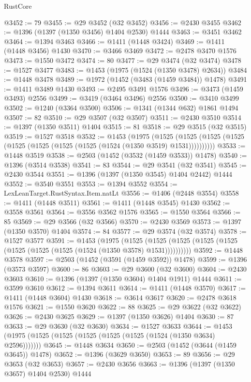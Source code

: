 \begin{lexlean}{RustCore}
\begin{coremodule}
{\begin{coremodule}
{{{{{{{{{{{{{{{{{{{{{{{{{{{{{{{{{{{{{{{{{{{{{@3452 := 79
@3455 := @29 @3452 (@32 @3452)
@3456 := @2430 @3455
@3462 := @1396 (@1397 (@1350 @3456) @1404 @2530) @1444
@3463 := @3451 @3462
@3464 := @1394 @3463
@3466 := @1411 (@1448 @3424)
@3469 := @1411 (@1448 @3456) @1430
@3470 := @3466 @3469
@3472 := @2478 @3470 @1576
@3473 := @1550 @3472
@3474 := 80
@3477 := @29 @3474 (@32 @3474)
@3478 := @1527 @3477
@3483 := @1453 (@1975 (@1524 (@1350 @3478) @2634))
@3484 := @1448 @3478
@3489 := @1972 (@1452 (@3483 (@1459 @3484)) @1478)
@3491 := @1411 @3489 @1430
@3493 := @2495 @3491 @1576
@3496 := @3473 (@1459 @3493) @2556
@3499 := @3419 (@3464 @3496) @2556
@3500 := @3410 @3499
@3502 := @1240 (@3364 @3500)
@3506 := @1341 (@1344 @632) @1861 @1494
@3507 := 82
@3510 := @29 @3507 (@32 @3507)
@3511 := @2430 @3510
@3514 := @1397 (@1350 @3511) @1404
@3515 := 81
@3518 := @29 @3515 (@32 @3515)
@3519 := @1527 @3518
@3532 := @1453
    (@1975
      (@1525 (@1525 (@1525 (@1525 (@1525 (@1525 (@1525 (@1525 (@1524 (@1350 @3519) @1531))))))))))
@3533 := @1448 @3519
@3538 := @2503 (@1452 (@3532 (@1459 @3533)) @1478)
@3540 := @1396 (@3514 @3538)
@3541 := 83
@3544 := @29 @3541 (@32 @3541)
@3545 := @2430 @3544
@3551 := @1396 (@1397 (@1350 @3545) @1404 @2442) @1444
@3552 := @3540 @3551
@3553 := @1394 @3552
@3554 := LexLeanTarget.RustSyntax.Item.natLt
@3556 := @1406 (@2448 @3554)
@3558 := @1411 (@1448 @3511)
@3561 := @1411 (@1448 @3545) @1430
@3562 := @3558 @3561
@3564 := @3556 @3562 @1576
@3565 := @1550 @3564
@3566 := 85
@3569 := @29 @3566 (@32 @3566)
@3570 := @2430 @3569
@3573 := @1397 (@1350 @3570) @1404
@3574 := 84
@3577 := @29 @3574 (@32 @3574)
@3578 := @1527 @3577
@3591 := @1453
    (@1975
      (@1525 (@1525 (@1525 (@1525 (@1525 (@1525 (@1525 (@1525 (@1524 (@1350 @3578) @1531))))))))))
@3592 := @1448 @3578
@3597 := @2503 (@1452 (@3591 (@1459 @3592)) @1478)
@3599 := @1396 (@3573 @3597)
@3600 := 86
@3603 := @29 @3600 (@32 @3600)
@3604 := @2430 @3603
@3610 := @1396 (@1397 (@1350 @3604) @1404 @1911) @1444
@3611 := @3599 @3610
@3612 := @1394 @3611
@3614 := @1411 (@1448 @3570)
@3617 := @1411 (@1448 @3604) @1430
@3618 := @3614 @3617
@3620 := @2478 @3618 @1576
@3621 := @1550 @3620
@3622 := 88
@3625 := @29 @3622 (@32 @3622)
@3626 := @2430 @3625
@3629 := @1397 (@1350 @3626) @1404
@3630 := 87
@3633 := @29 @3630 (@32 @3630)
@3634 := @1527 @3633
@3644 := @1453 (@1975 (@1525 (@1525 (@1525 (@1525 (@1525 (@1524 (@1350 @3634) @2596)))))))
@3645 := @1448 @3634
@3650 := @2503 (@1452 (@3644 (@1459 @3645)) @1478)
@3652 := @1396 (@3629 @3650)
@3653 := 89
@3656 := @29 @3653 (@32 @3653)
@3657 := @2430 @3656
@3663 := @1396 (@1397 (@1350 @3657) @1404 @2530) @1444
}}}}}}}}}}}}}}}}}}}}}}}}}}}}}}}}}}}}}}}}}}}}}
\end{coremodule}}
\end{coremodule}
\end{lexlean}
